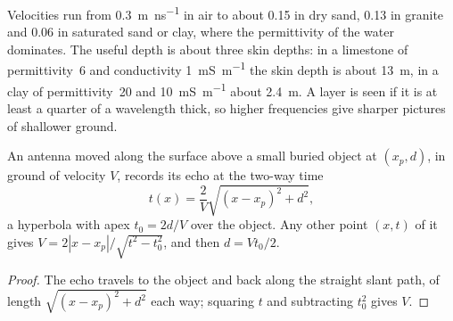 Velocities run from \qty{0.3}{m.ns^{-1}} in air to about \num{0.15} in
dry sand, \num{0.13} in granite and \num{0.06} in saturated sand or
clay, where the permittivity of the water dominates. The useful depth
is about three skin depths: in a limestone of permittivity~6 and
conductivity \qty{1}{mS.m^{-1}} the skin depth is about \qty{13}{m},
in a clay of permittivity~20 and \qty{10}{mS.m^{-1}} about
\qty{2.4}{m}. A layer is seen if it is at least a quarter of a
wavelength thick, so higher frequencies give sharper pictures of
shallower ground.

\begin{proposition}\label{prop:b3:field-lab-methods-3:hyperbola}
An antenna moved along the surface above a small buried object at
$(x_p, d)$, in ground of velocity $V$, records its echo at the two-way
time
\[
t(x) = \frac{2}{V}\sqrt{(x - x_p)^2 + d^2} ,
\]
a hyperbola with apex $t_0 = 2d/V$ over the object. Any other point
$(x, t)$ of it gives $V = 2|x - x_p|/\sqrt{t^2 - t_0^2}$, and then $d =
Vt_0/2$.
\end{proposition}

\begin{proof}
The echo travels to the object and back along the straight slant path,
of length $\sqrt{(x - x_p)^2 + d^2}$ each way; squaring $t$ and
subtracting $t_0^2$ gives $V$.
\end{proof}

